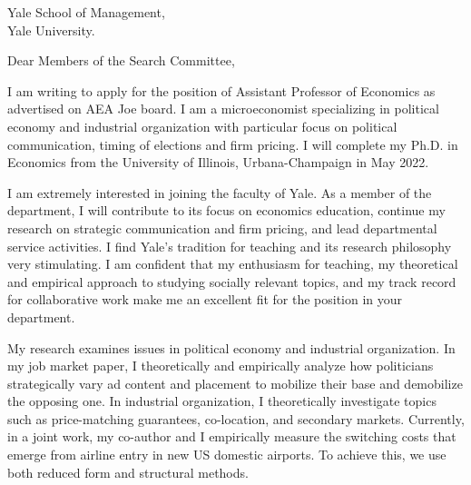 \documentclass[12pt]{letter}
\begin{document}
\date{}
\begin{letter}{Yale School of Management,\\
Yale University.}

\opening{Dear Members of the Search Committee,}

I am writing to apply for the position of Assistant Professor of Economics as advertised on AEA Joe board.
I am a microeconomist specializing in political economy and industrial organization with particular focus on political communication, timing of elections and firm pricing.
I will complete my Ph.D. in Economics from the University of Illinois, Urbana-Champaign in May 2022. 

I am extremely interested in joining the faculty of Yale.
As a member of the department, I will contribute to its focus on economics education,
continue my research on strategic communication and firm pricing, and lead departmental service activities.
%
I find Yale's tradition for teaching and its research philosophy very stimulating.
I am confident that my enthusiasm for teaching, my theoretical and empirical approach to studying socially relevant topics, 
and my track record for collaborative work make me an excellent fit for the position in your department. 



My research examines issues in political economy and industrial organization.
In my job market paper, I theoretically and empirically analyze how politicians strategically vary ad content and placement to mobilize their base and demobilize the opposing one.
In industrial organization, I theoretically investigate topics such as price-matching guarantees, co-location, and secondary markets.
Currently, in a joint work, my co-author and I empirically measure the switching costs that emerge from airline entry in new US domestic airports.
To achieve this, we use both reduced form and structural methods.


\end{letter}
\end{document}
